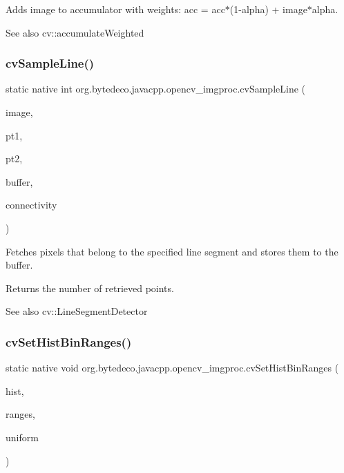 Adds image to accumulator with weights\+: acc = acc$\ast$(1-\/alpha) + image$\ast$alpha. 

\begin{DoxySeeAlso}{See also}
cv\+::accumulate\+Weighted 
\end{DoxySeeAlso}
\mbox{\label{group__imgproc__c_gaea92829f3b2b25c80d12aa39d189fd70}} 
\subsubsection{\texorpdfstring{cv\+Sample\+Line()}{cvSampleLine()}}
{\footnotesize\ttfamily static native int org.\+bytedeco.\+javacpp.\+opencv\+\_\+imgproc.\+cv\+Sample\+Line (\begin{DoxyParamCaption}\item[{@Const Cv\+Arr}]{image,  }\item[{@By\+Val Cv\+fr.antproject.utils.Point}]{pt1,  }\item[{@By\+Val Cv\+fr.antproject.utils.Point}]{pt2,  }\item[{Pointer}]{buffer,  }\item[{int}]{connectivity }\end{DoxyParamCaption})\hspace{0.3cm}{\ttfamily [static]}}



Fetches pixels that belong to the specified line segment and stores them to the buffer. 

Returns the number of retrieved points. \begin{DoxySeeAlso}{See also}
cv\+::\+Line\+Segment\+Detector 
\end{DoxySeeAlso}
\mbox{\label{group__imgproc__c_ga0e759a50b0655297cb3cb3215bdb0f5b}} 
\subsubsection{\texorpdfstring{cv\+Set\+Hist\+Bin\+Ranges()}{cvSetHistBinRanges()}}
{\footnotesize\ttfamily static native void org.\+bytedeco.\+javacpp.\+opencv\+\_\+imgproc.\+cv\+Set\+Hist\+Bin\+Ranges (\begin{DoxyParamCaption}\item[{Cv\+Histogram}]{hist,  }\item[{@Cast(\char`\"{}float$\ast$$\ast$\char`\"{}) Pointer\+Pointer}]{ranges,  }\item[{int}]{uniform }\end{DoxyParamCaption})\hspace{0.3cm}{\ttfamily [static]}}



